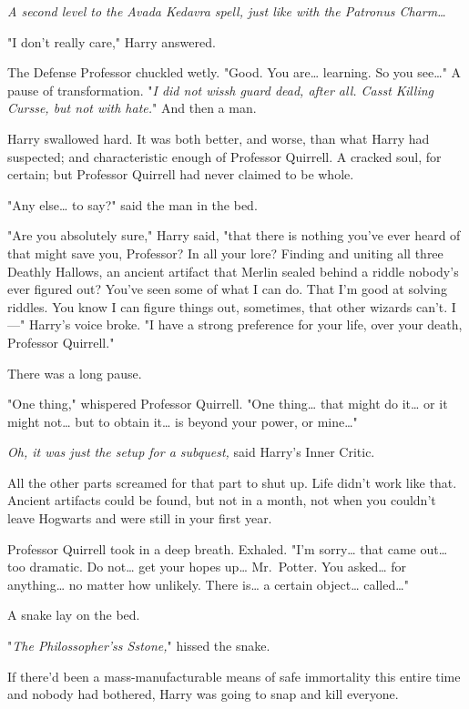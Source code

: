 \emph{A second level to the Avada Kedavra spell, just like with the Patronus 
Charm{\ldots}}

"I don't really care," Harry answered.

The Defense Professor chuckled wetly. "Good. You are{\ldots} learning. So you 
see{\ldots}" A pause of transformation. "\emph{I did not wissh guard dead, 
after all. Casst Killing Cursse, but not with hate.}" And then a man.

Harry swallowed hard. It was both better, and worse, than what Harry had 
suspected; and characteristic enough of Professor Quirrell. A cracked soul, for 
certain; but Professor Quirrell had never claimed to be whole.

"Any else{\ldots} to say?" said the man in the bed.

"Are you absolutely sure," Harry said, "that there is nothing you've ever heard 
of that might save you, Professor? In all your lore? Finding and uniting all 
three Deathly Hallows, an ancient artifact that Merlin sealed behind a riddle 
nobody's ever figured out? You've seen some of what I can do. That I'm good at 
solving riddles. You know I can figure things out, sometimes, that other 
wizards can't. I---" Harry's voice broke. "I have a strong preference for your 
life, over your death, Professor Quirrell."

There was a long pause.

"One thing," whispered Professor Quirrell. "One thing{\ldots} that might do 
it{\ldots} or it might not{\ldots} but to obtain it{\ldots} is beyond your 
power, or mine{\ldots}"

\emph{Oh, it was just the setup for a subquest,} said Harry's Inner Critic.

All the other parts screamed for that part to shut up. Life didn't work like 
that. Ancient artifacts could be found, but not in a month, not when you 
couldn't leave Hogwarts and were still in your first year.

Professor Quirrell took in a deep breath. Exhaled. "I'm sorry{\ldots} that came 
out{\ldots} too dramatic. Do not{\ldots} get your hopes up{\ldots} Mr.~Potter. 
You asked{\ldots} for anything{\ldots} no matter how unlikely. There is{\ldots} 
a certain object{\ldots} called{\ldots}"

A snake lay on the bed.

"\emph{The Philossopher'ss Sstone,}" hissed the snake.

If there'd been a mass-manufacturable means of safe immortality this entire 
time and nobody had bothered, Harry was going to snap and kill everyone.

